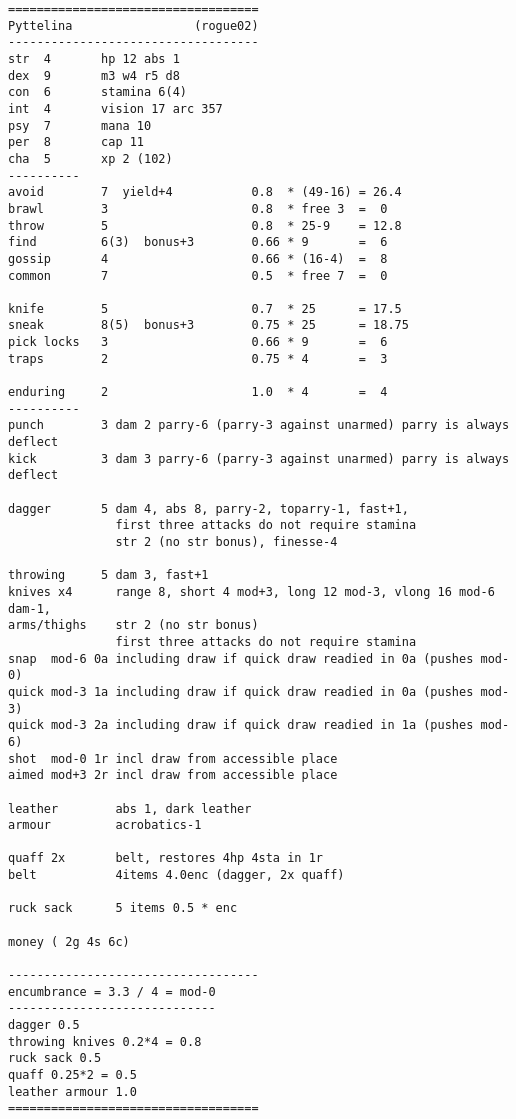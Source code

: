 \goodbreak
\tiny \begin{samepage} \begin{verbatim}
===================================
Pyttelina                 (rogue02)
-----------------------------------
str  4       hp 12 abs 1
dex  9       m3 w4 r5 d8
con  6       stamina 6(4)
int  4       vision 17 arc 357
psy  7       mana 10
per  8       cap 11
cha  5       xp 2 (102)
----------
avoid        7  yield+4           0.8  * (49-16) = 26.4
brawl        3                    0.8  * free 3  =  0
throw        5                    0.8  * 25-9    = 12.8
find         6(3)  bonus+3        0.66 * 9       =  6
gossip       4                    0.66 * (16-4)  =  8
common       7                    0.5  * free 7  =  0

knife        5                    0.7  * 25      = 17.5
sneak        8(5)  bonus+3        0.75 * 25      = 18.75
pick locks   3                    0.66 * 9       =  6
traps        2                    0.75 * 4       =  3

enduring     2                    1.0  * 4       =  4
----------
punch        3 dam 2 parry-6 (parry-3 against unarmed) parry is always deflect
kick         3 dam 3 parry-6 (parry-3 against unarmed) parry is always deflect

dagger       5 dam 4, abs 8, parry-2, toparry-1, fast+1,
               first three attacks do not require stamina
               str 2 (no str bonus), finesse-4

throwing     5 dam 3, fast+1
knives x4      range 8, short 4 mod+3, long 12 mod-3, vlong 16 mod-6 dam-1,
arms/thighs    str 2 (no str bonus)
               first three attacks do not require stamina
snap  mod-6 0a including draw if quick draw readied in 0a (pushes mod-0)
quick mod-3 1a including draw if quick draw readied in 0a (pushes mod-3)
quick mod-3 2a including draw if quick draw readied in 1a (pushes mod-6)
shot  mod-0 1r incl draw from accessible place
aimed mod+3 2r incl draw from accessible place

leather        abs 1, dark leather
armour         acrobatics-1

quaff 2x       belt, restores 4hp 4sta in 1r
belt           4items 4.0enc (dagger, 2x quaff)

ruck sack      5 items 0.5 * enc

money ( 2g 4s 6c)

-----------------------------------
encumbrance = 3.3 / 4 = mod-0
-----------------------------
dagger 0.5
throwing knives 0.2*4 = 0.8
ruck sack 0.5
quaff 0.25*2 = 0.5
leather armour 1.0
===================================
\end{verbatim} \end{samepage} \normalsize












